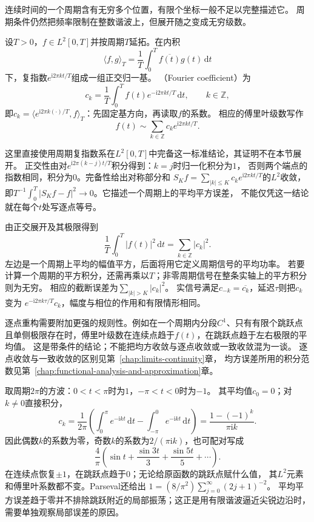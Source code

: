 连续时间的一个周期含有无穷多个位置，有限个坐标一般不足以完整描述它。
周期条件仍然把频率限制在整数谐波上，但展开随之变成无穷级数。
\begin{definition}[周期信号的傅里叶系数与级数]
  \label{def:signal-analysis-fourier-series}
  设$T>0$，$f\in L^2[0,T]$并按周期$T$延拓。在内积
  \[
    \langle f,g\rangle_T=\frac1T\int_0^T \overline{f(t)}g(t)\,\mathrm dt
  \]
  下，复指数$e^{\mathrm i2\pi kt/T}$组成一组正交归一基。
  （Fourier coefficient）为
  \[
    c_k=\frac1T\int_0^T f(t)e^{-\mathrm i2\pi kt/T}\,\mathrm dt,
    \qquad k\in\mathbb Z,
  \]
  即$c_k=\langle e^{\mathrm i2\pi k(\cdot)/T},f\rangle_T$：先固定基方向，再读取$f$的系数。
  相应的傅里叶级数写作
  \begin{equation}
    f(t)\sim\sum_{k\in\mathbb Z}c_ke^{\mathrm i2\pi kt/T}.
    \label{eq:signal-analysis-fourier-series}
  \end{equation}
\end{definition}
这里直接使用周期复指数系在$L^2[0,T]$中完备这一标准结论，其证明不在本节展开。
正交性由对$e^{\mathrm i2\pi(k-j)t/T}$积分得到：$k=j$时归一化积分为$1$，
否则两个端点的指数相同，积分为$0$。完备性给出对称部分和
$S_Kf=\sum_{|k|\leq K}c_ke^{\mathrm i2\pi kt/T}$的$L^2$收敛，
即$T^{-1}\int_0^T|S_Kf-f|^2\to0$。它描述一个周期上的平均平方误差，
不能仅凭这一结论就在每个$t$处写逐点等号。

由正交展开及其极限得到
\begin{equation}
  \frac1T\int_0^T|f(t)|^2\,\mathrm dt
  =\sum_{k\in\mathbb Z}|c_k|^2.
  \label{eq:signal-analysis-continuous-parseval}
\end{equation}
左边是一个周期上平均的幅值平方，后面将用它定义周期信号的平均功率。
若要计算一个周期的平方积分，还需再乘以$T$；非零周期信号在整条实轴上的平方积分则为无穷。
相应的截断误差为$\sum_{|k|>K}|c_k|^2$。
实信号满足$c_{-k}=\overline{c_k}$，延迟$\tau$则把$c_k$变为
$e^{-\mathrm i2\pi k\tau/T}c_k$，幅度与相位的作用和有限情形相同。

逐点重构需要附加更强的规则性。例如在一个周期内分段$C^1$、只有有限个跳跃点
且单侧极限存在时，傅里叶级数在连续点趋于$f(t)$，在跳跃点趋于左右极限的平均值。
这是带条件的结论；不能把均方收敛与逐点收敛或一致收敛混为一谈。
逐点收敛与一致收敛的区别见第~\ref{chap:limits-continuity}章，
均方误差所用的积分范数见第~\ref{chap:functional-analysis-and-approximation}章。

取周期$2\pi$的方波：$0<t<\pi$时为$1$，$-\pi<t<0$时为$-1$。
其平均值$c_0=0$；对$k\neq0$直接积分，
\[
  c_k=\frac1{2\pi}\left(
    \int_0^\pi e^{-\mathrm ikt}\,\mathrm dt
    -\int_{-\pi}^0 e^{-\mathrm ikt}\,\mathrm dt\right)
  =\frac{1-(-1)^k}{\pi\mathrm ik}.
\]
因此偶数$k$的系数为零，奇数$k$的系数为$2/(\pi\mathrm ik)$，也可配对写成
\[
  \frac4\pi\left(\sin t+\frac{\sin3t}{3}+\frac{\sin5t}{5}+\cdots\right).
\]
在连续点恢复$\pm1$，在跳跃点趋于$0$；无论给原函数的跳跃点赋什么值，
其$L^2$元素和傅里叶系数都不变。Parseval还给出
$1=(8/\pi^2)\sum_{j=0}^{\infty}(2j+1)^{-2}$。
平均平方误差趋于零并不排除跳跃附近的局部振荡；这正是用有限谐波逼近尖锐边沿时，
需要单独观察局部误差的原因。

